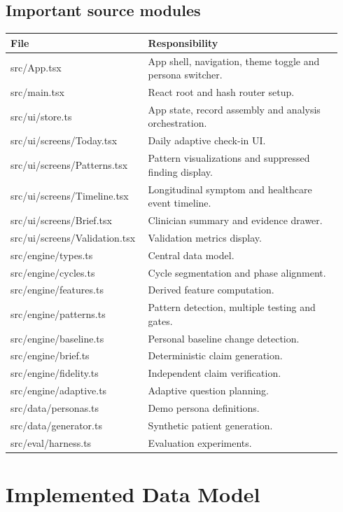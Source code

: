 \documentclass[11pt,a4paper]{article}
\begin{document}
\subsection{Important source modules}

\begin{longtable}{>{\ttfamily}p{0.36\linewidth}p{0.58\linewidth}}
\toprule
File & Responsibility \\
\midrule
src/App.tsx & App shell, navigation, theme toggle and persona switcher. \\
src/main.tsx & React root and hash router setup. \\
src/ui/store.ts & App state, record assembly and analysis orchestration. \\
src/ui/screens/Today.tsx & Daily adaptive check-in UI. \\
src/ui/screens/Patterns.tsx & Pattern visualizations and suppressed finding display. \\
src/ui/screens/Timeline.tsx & Longitudinal symptom and healthcare event timeline. \\
src/ui/screens/Brief.tsx & Clinician summary and evidence drawer. \\
src/ui/screens/Validation.tsx & Validation metrics display. \\
src/engine/types.ts & Central data model. \\
src/engine/cycles.ts & Cycle segmentation and phase alignment. \\
src/engine/features.ts & Derived feature computation. \\
src/engine/patterns.ts & Pattern detection, multiple testing and gates. \\
src/engine/baseline.ts & Personal baseline change detection. \\
src/engine/brief.ts & Deterministic claim generation. \\
src/engine/fidelity.ts & Independent claim verification. \\
src/engine/adaptive.ts & Adaptive question planning. \\
src/data/personas.ts & Demo persona definitions. \\
src/data/generator.ts & Synthetic patient generation. \\
src/eval/harness.ts & Evaluation experiments. \\
\bottomrule
\end{longtable}

\section{Implemented Data Model}
\end{document}

